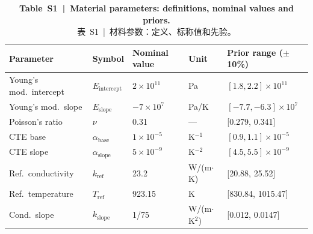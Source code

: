 \documentclass[11pt,a4paper]{article}
\newcommand{\Eint}{\ensuremath{E_{\mathrm{intercept}}}}
\newcommand{\Eslope}{\ensuremath{E_{\mathrm{slope}}}}
\newcommand{\abase}{\ensuremath{\alpha_{\mathrm{base}}}}
\newcommand{\aslope}{\ensuremath{\alpha_{\mathrm{slope}}}}
\newcommand{\kref}{\ensuremath{k_{\mathrm{ref}}}}
\newcommand{\Tref}{\ensuremath{T_{\mathrm{ref}}}}
\newcommand{\kslope}{\ensuremath{k_{\mathrm{slope}}}}
\begin{document}
\begin{table}[htbp]
\centering
\caption{\textbf{Table~S1~|~Material parameters: definitions, nominal values
and priors.}\\
\small 表~S1~|~材料参数：定义、标称值和先验。}
\label{tab:S1}
\smallskip
\small
\begin{tabular}{lllll}
\toprule
Parameter & Symbol & Nominal value & Unit & Prior range ($\pm$10\%) \\
\midrule
Young's mod.\ intercept & \Eint{} & $2\times10^{11}$ & Pa
  & $[1.8, 2.2]\times10^{11}$ \\
Young's mod.\ slope & \Eslope{} & $-7\times10^{7}$ & Pa/K
  & $[-7.7, -6.3]\times10^{7}$ \\
Poisson's ratio & $\nu$ & 0.31 & ---
  & [0.279, 0.341] \\
CTE base & \abase{} & $1\times10^{-5}$ & K$^{-1}$
  & $[0.9, 1.1]\times10^{-5}$ \\
CTE slope & \aslope{} & $5\times10^{-9}$ & K$^{-2}$
  & $[4.5, 5.5]\times10^{-9}$ \\
Ref.\ conductivity & \kref{} & 23.2 & W/(m$\cdot$K)
  & [20.88, 25.52] \\
Ref.\ temperature & \Tref{} & 923.15 & K
  & [830.84, 1015.47] \\
Cond.\ slope & \kslope{} & 1/75 & W/(m$\cdot$K$^2$)
  & [0.012, 0.0147] \\
\bottomrule
\end{tabular}
\end{table}
\end{document}
